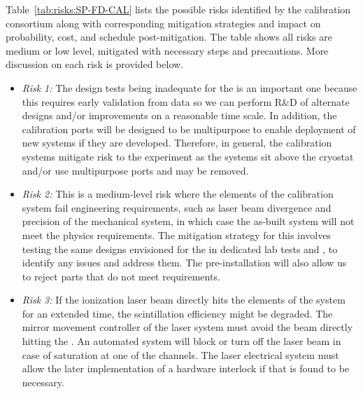 

Table~\ref{tab:risks:SP-FD-CAL} lists the possible risks identified by the calibration consortium along with corresponding mitigation strategies and impact on probability, cost, and schedule post-mitigation.
The table shows all risks are medium or low level, mitigated with necessary steps and precautions. More discussion on each risk is provided below. 
\begin{itemize}
    \item \textit{Risk 1:} The  design tests being inadequate for the  is an important one because this requires early validation from  data so we can perform R\&D of alternate designs and/or improvements on a reasonable time scale. In addition, the calibration ports will be designed to be multipurpose to enable deployment of new systems if they are developed. Therefore, in general, the calibration systems mitigate risk to the experiment as the systems sit above the cryostat and/or use multipurpose ports and may be removed.
    \item \textit{Risk 2:} This is a medium-level risk where the elements of the calibration system fail engineering requirements, such as laser beam divergence and precision of the mechanical system, in which case the as-built system will not meet the physics requirements. The mitigation strategy for this involves testing the same designs envisioned for the  in dedicated lab tests and , to identify any issues and address them. The pre-installation  will also allow us to reject parts that do not meet requirements. 
    \item \textit{Risk 3:} If the ionization laser beam directly hits the elements of the  system for an extended time, the scintillation efficiency might be degraded. The mirror movement controller of the laser system must avoid the beam directly hitting the . An automated system will block or turn off the laser beam in case of saturation at one of the  channels. The laser electrical system must allow the later implementation of a hardware interlock if that is found to be necessary.

\end{itemize}
